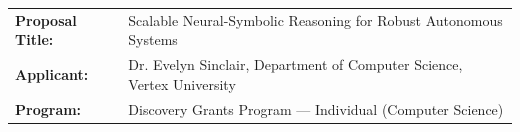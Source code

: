 \documentclass[12pt, letterpaper]{article}
\begin{document}
\begin{tcolorbox}[colback=nsercnavy, colframe=nsercnavy, arc=4pt, left=12pt, right=12pt, top=10pt, bottom=10pt]
  \color{white}
  \noindent
  \begin{tabularx}{\textwidth}{l X}
    \textbf{Proposal Title:} & Scalable Neural-Symbolic Reasoning for Robust Autonomous Systems \\
    \textbf{Applicant:} & Dr. Evelyn Sinclair, Department of Computer Science, Vertex University \\
    \textbf{Program:} & Discovery Grants Program --- Individual (Computer Science) \\
  \end{tabularx}
\end{tcolorbox}







\end{document}
